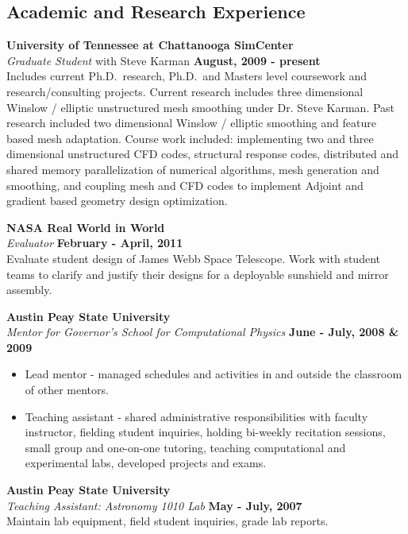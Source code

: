 \documentclass[margin,line]{res}
\begin{document}
\begin{resume}
\section{\sc Academic and Research Experience}

{\bf University of Tennessee at Chattanooga SimCenter}\\
{\em Graduate Student} with Steve Karman \hfill {\bf August, 2009 - present}\\
Includes current Ph.D.~research, Ph.D.~and Masters level coursework and
research/consulting projects.  Current research includes three dimensional Winslow / elliptic unstructured mesh smoothing under Dr. Steve Karman.  Past research included two dimensional Winslow / elliptic smoothing and feature based mesh adaptation.  Course work included: implementing two and three dimensional unstructured CFD codes, structural response codes, distributed and shared memory parallelization of numerical algorithms, mesh generation and smoothing, and coupling mesh and CFD codes to implement Adjoint and gradient based geometry design optimization.

{\bf NASA Real World in World}\\
{\em Evaluator} \hfill {\bf February - April, 2011}\\
Evaluate student design of James Webb Space Telescope.  Work with student teams to clarify and justify their designs for a deployable sunshield and mirror assembly.

{\bf Austin Peay State University}\\
{\em Mentor for Governor's School for Computational Physics} \hfill {\bf June - July, 2008 \& 2009}\\
\begin{itemize}
\item Lead mentor - managed schedules and activities in and outside the classroom of other mentors.
\item Teaching assistant - shared administrative responsibilities with faculty
instructor, fielding student inquiries, holding bi-weekly recitation sessions, small group and one-on-one tutoring, teaching computational and experimental labs, developed projects and exams.
\end{itemize}

{\bf Austin Peay State University}\\
{\em Teaching Assistant: Astronomy 1010 Lab} \hfill {\bf May - July, 2007}\\
Maintain lab equipment, field student inquiries, grade lab reports. 


\end{resume}
\end{document}
